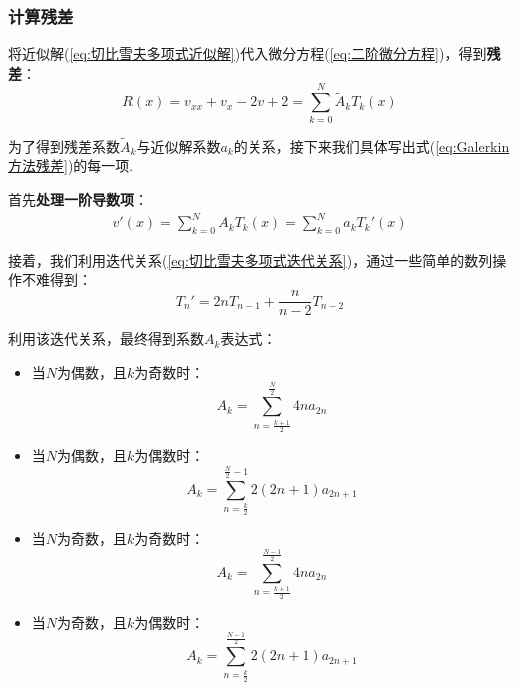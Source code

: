 \documentclass[12pt]{ctexart}
\numberwithin{equation}{section} %
\begin{document}
\subsubsection{计算残差}
    将近似解(\ref{eq:切比雪夫多项式近似解})代入微分方程(\ref{eq:二阶微分方程})，得到\textbf{残差}：
    \begin{equation}
        R(x)=v_{xx}+v_x-2v+2=\sum\limits_{k=0}^N\tilde{A}_kT_k(x)
        \label{eq:Galerkin方法残差}
    \end{equation}

    为了得到残差系数$\tilde{A}_k$与近似解系数$a_k$的关系，接下来我们具体写出式(\ref{eq:Galerkin方法残差})的每一项.

    首先\textbf{处理一阶导数项}：
    \begin{equation}
    \begin{aligned}v'(x)=\sum_{k=0}^NA_kT_k(x)=\sum_{k=0}^Na_kT_k'(x)\end{aligned}
    \label{eq:处理一阶导数项}
    \end{equation}

    接着，我们利用迭代关系(\ref{eq:切比雪夫多项式迭代关系})，通过一些简单的数列操作不难得到：
    \begin{equation}
        T_n'=2nT_{n-1}+\frac{n}{n-2}T_{n-2}
    \end{equation}

    利用该迭代关系，最终得到系数$A_k$表达式：
    \begin{itemize}
        \item 当$N$为偶数，且$k$为奇数时：
        \begin{equation}
            A_k=\sum_{n=\frac{k+1}{2}}^{\frac{N}{2}}4na_{2n}
            \label{eq:残差系数1}
        \end{equation}
        \item 当$N$为偶数，且$k$为偶数时：
        \begin{equation}
            A_k=\sum\limits_{n=\frac{k}{2}}^{\frac{N}{2}-1}2(2n+1)a_{2n+1}
            \label{eq:残差系数2}
        \end{equation}
        \item 当$N$为奇数，且$k$为奇数时：
        \begin{equation}
            A_k=\sum_{n=\frac{k+1}{2}}^{\frac{N-1}{2}}4na_{2n}
            \label{eq:残差系数3}
        \end{equation}
        \item 当$N$为奇数，且$k$为偶数时：
        \begin{equation}
            A_k=\sum\limits_{n=\frac{k}{2}}^{\frac{N-1}{2}}2(2n+1)a_{2n+1}
            \label{eq:残差系数4}
        \end{equation}
    \end{itemize}
\end{document}
